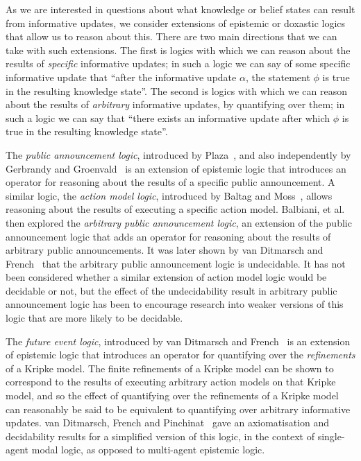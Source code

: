 As we are interested in questions about what knowledge or belief states can
result from informative updates, we consider extensions of epistemic or doxastic
logics that allow us to reason about this. There are two main directions that we
can take with such extensions. The first is logics with which we can reason
about the results of {\em specific} informative updates; in such a logic we can
say of some specific informative update that ``after the informative update
$\alpha$, the statement $\phi$ is true in the resulting knowledge state''. The
second is logics with which we can reason about the results of {\em arbitrary}
informative updates, by quantifying over them; in such a logic we can say
that ``there exists an informative update after which $\phi$ is true in the
resulting knowledge state''.

The {\em public announcement logic}, introduced by
Plaza~\cite{plaza2007logics}, and also independently by Gerbrandy and
Groenvald~\cite{gerbrandy1997reasoning} is an extension of epistemic logic that
introduces an operator for reasoning about the results of a specific public
announcement. A similar logic, the {\em action model logic}, introduced by
Baltag and Moss~\cite{baltag2004logics}, allows reasoning about the results of
executing a specific action model. Balbiani, et
al.~\cite{balbiani2007arbitrary} then explored the {\em arbitrary public
announcement logic}, an extension of the public announcement logic that adds an
operator for reasoning about the results of arbitrary public announcements.  It
was later shown by van Ditmarsch and French~\cite{french2008undecidability}
that the arbitrary public announcement logic is undecidable. It has not been
considered whether a similar extension of action model logic would be decidable
or not, but the effect of the undecidability result in arbitrary public
announcement logic has been to encourage research into weaker versions of this
logic that are more likely to be decidable.

The {\em future event logic}, introduced by van Ditmarsch and
French~\cite{french2009simulation} is an extension of epistemic logic that
introduces an operator for quantifying over the {\em refinements} of a Kripke
model. The finite refinements of a Kripke model can be shown to correspond to
the results of executing arbitrary action models on that Kripke model, and so
the effect of quantifying over the refinements of a Kripke model can reasonably
be said to be equivalent to quantifying over arbitrary informative updates. van
Ditmarsch, French and Pinchinat~\cite{french2010future} gave an axiomatisation
and decidability results for a simplified version of this logic, in the context
of single-agent modal logic, as opposed to multi-agent epistemic logic.

